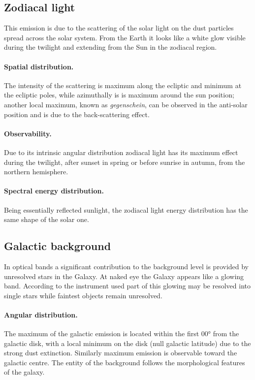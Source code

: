 \documentclass{book}
\begin{document}
\subsection{Zodiacal light}
This emission is due to the scattering of the solar light on the dust particles spread across the solar system. From the Earth it looks like a white glow visible during the twilight and extending from the Sun in the zodiacal region.

\paragraph{Spatial distribution.} The intensity of the scattering is maximum along the ecliptic and minimum at the ecliptic poles, while azimuthally is is maximum around the sun position; another local maximum, known as \emph{gegenschein}, can be observed in the anti-solar position and is due to the back-scattering effect.

\paragraph{Observability.} Due to its intrinsic angular distribution zodiacal light has its maximum effect during the twilight, after sunset in spring or before sunrise in autumn, from the northern hemisphere.

\paragraph{Spectral energy distribution.} Being essentially reflected sunlight, the zodiacal light energy distribution has the same shape of the solar one.

\subsection{Galactic background}
In optical bands a significant contribution to the background level is provided by unresolved stars in the Galaxy. At naked eye the Galaxy appears like a glowing band. According to the instrument used part of this glowing may be resolved into single stars while faintest objects remain unresolved.

\paragraph{Angular distribution.} The maximum of the galactic emission is located within the first \ang{00} from the galactic disk, with a local minimum on the disk (null galactic latitude) due to the strong dust extinction. Similarly maximum emission is observable toward the galactic centre. The entity of the background follows the morphological features of the galaxy.
\end{document}
